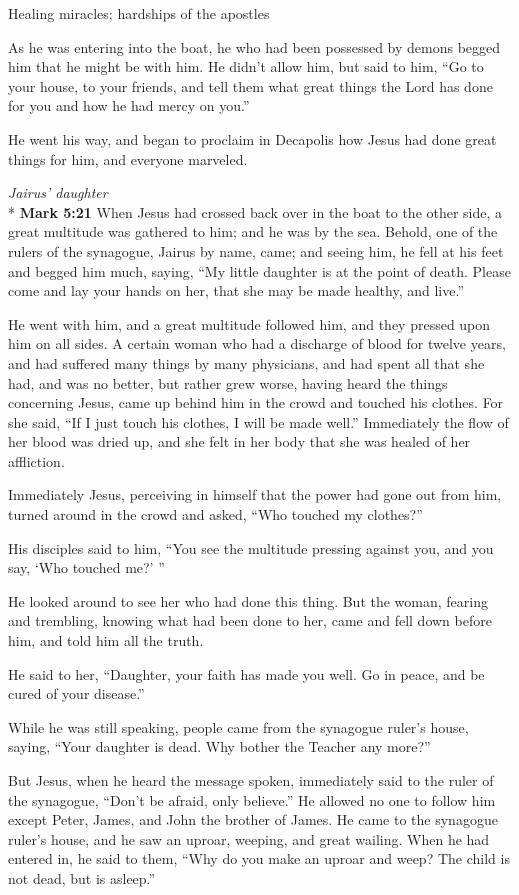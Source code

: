 \documentclass[10pt,twoside]{article} %
\newcommand{\quotesize}{\normalsize{}}
\newenvironment{quotetext}{\begingroup\quotesize}{\endgroup}
\newcommand{\intex}[1]{\index[texts]{#1}}
\newcommand{\bible}[2]{\begin{quotetext}\textbf{#1}\intex{#1} #2\end{quotetext}}
\newcommand{\gospelmark}[2]{\bible{Mark #1}{#2}}
\newcommand{\subhead}[1]{\emph{#1}\\*}
\begin{document}
\begin{section}{Healing miracles; hardships of the apostles}
{  As he was entering into the boat, he who had been possessed by demons begged him that he might be with him.   He didn't allow him, but said to him, ``Go to your house, to your friends, and tell them what great things the Lord has done for you and how he had mercy on you.''

  He went his way, and began to proclaim in Decapolis how Jesus had done great things for him, and everyone marveled.
}

\subhead{Jairus' daughter}
\gospelmark{5:21}{
  When Jesus had crossed back over in the boat to the other side, a great multitude was gathered to him; and he was by the sea.   Behold, one of the rulers of the synagogue, Jairus by name, came; and seeing him, he fell at his feet   and begged him much, saying, ``My little daughter is at the point of death. Please come and lay your hands on her, that she may be made healthy, and live.''

  He went with him, and a great multitude followed him, and they pressed upon him on all sides.   A certain woman who had a discharge of blood for twelve years,   and had suffered many things by many physicians, and had spent all that she had, and was no better, but rather grew worse,   having heard the things concerning Jesus, came up behind him in the crowd and touched his clothes.   For she said, ``If I just touch his clothes, I will be made well.''   Immediately the flow of her blood was dried up, and she felt in her body that she was healed of her affliction.

  Immediately Jesus, perceiving in himself that the power had gone out from him, turned around in the crowd and asked, ``Who touched my clothes?''

  His disciples said to him, ``You see the multitude pressing against you, and you say, `Who touched me?' ''

  He looked around to see her who had done this thing.   But the woman, fearing and trembling, knowing what had been done to her, came and fell down before him, and told him all the truth.

  He said to her, ``Daughter, your faith has made you well. Go in peace, and be cured of your disease.''

  While he was still speaking, people came from the synagogue ruler's house, saying, ``Your daughter is dead. Why bother the Teacher any more?''

  But Jesus, when he heard the message spoken, immediately said to the ruler of the synagogue, ``Don't be afraid, only believe.''   He allowed no one to follow him except Peter, James, and John the brother of James.   He came to the synagogue ruler's house, and he saw an uproar, weeping, and great wailing.   When he had entered in, he said to them, ``Why do you make an uproar and weep? The child is not dead, but is asleep.''

}
\end{section}
\end{document}
